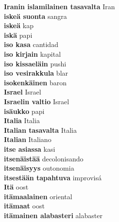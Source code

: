 \textbf{ Iranin islamilainen tasavalta  } Iran \\
\textbf{ iskeä suonta  } sangra \\
\textbf{ iskeä  } kap \\
\textbf{ iskä  } papi \\
\textbf{ iso kasa  } cantidad \\
\textbf{ iso kirjain  } kapital \\
\textbf{ iso kissaeläin  } pushi \\
\textbf{ iso vesirakkula  } blar \\
\textbf{ isokenkäinen  } baron \\
\textbf{ Israel  } Israel \\
\textbf{ Israelin valtio  } Israel \\
\textbf{ isäukko  } papi \\
\textbf{ Italia  } Italia \\
\textbf{ Italian tasavalta  } Italia \\
\textbf{ Italian  } Italiano \\
\textbf{ itse asiassa  } kasi \\
\textbf{ itsenäistää  } decolonisando \\
\textbf{ itsenäisyys  } outonomia \\
\textbf{ itsestään tapahtuva  } improvisá \\
\textbf{ Itä  } oost \\
\textbf{ itämaalainen  } oriental \\
\textbf{ itämaat  } oost \\
\textbf{ itämainen alabasteri  } alabaster \\
